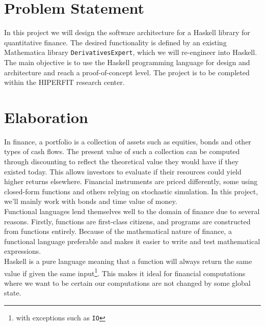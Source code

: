 \documentclass[11pt]{article}
\begin{document}
\section*{Problem Statement}

In this project we will design the software architecture for a Haskell library for quantitative finance.
The desired functionality is defined by an existing Mathematica library {\tt DerivativesExpert}, which
we will re-engineer into Haskell.
The main objective is to use the Haskell programming language for design and architecture and reach a proof-of-concept level.
The project is to be completed within the HIPERFIT research center.

\section*{Elaboration}

In finance, a portfolio is a collection of assets such as equities, bonds and other
types of cash flows. The present value of such a collection can be computed through
discounting to reflect the theoretical value they would have if they existed today. This allows
investors to evaluate if their resources could yield higher returns elsewhere.
Financial instruments are priced differently, some using closed-form functions and
others relying on stochastic simulation. In this project, we'll mainly work with bonds and
time value of money.\\

Functional languages lend themselves well to the domain of finance due
to several reasons. Firstly, functions are first-class citizens, and programs are constructed
from functions entirely. Because of the mathematical nature of finance, a functional
language preferable and makes it easier to write and test mathematical expressions.\\

Haskell is a pure language meaning that a function will always return the same value
if given the same input\footnote{with exceptions such as {\tt IO}}. This makes it ideal for
financial computations where we want to be certain our computations are not changed by some
global state.\\

\end{document}

